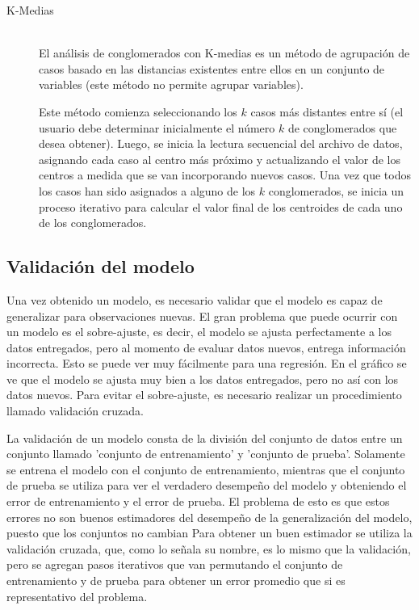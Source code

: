 \begin{enumerate}
\begin{description}
      \item[K-Medias] \hfill \\
      El análisis de conglomerados con K-medias es un método de agrupación de casos basado en las distancias existentes entre ellos en un conjunto de variables (este método no permite agrupar variables).
      
      Este método comienza seleccionando los $k$ casos más distantes entre sí (el usuario debe determinar inicialmente el número $k$ de conglomerados que desea obtener). Luego, se inicia la lectura secuencial del archivo de datos, asignando cada caso al centro más próximo y actualizando el valor de los centros a medida que se van incorporando nuevos casos. Una vez que todos los casos han sido asignados a alguno de los $k$ conglomerados, se inicia un proceso iterativo para calcular el valor final de los centroides de cada uno de los conglomerados. 
      
    \end{description}
\end{enumerate}


\subsection{Validación del modelo}

Una vez obtenido un modelo, es necesario validar que el modelo es capaz de generalizar para observaciones nuevas. El gran problema que puede ocurrir con un modelo es el sobre-ajuste\cite{Ng97preventingof}, es decir, el modelo se ajusta perfectamente a los datos entregados, pero al momento de evaluar datos nuevos, entrega información incorrecta. Esto se puede ver muy fácilmente para una regresión. En el gráfico se ve que el modelo se ajusta muy bien a los datos entregados, pero no así con los datos nuevos. Para evitar el sobre-ajuste, es necesario realizar un procedimiento llamado validación cruzada.

La validación de un modelo consta de la división del conjunto de datos entre un conjunto llamado 'conjunto de entrenamiento' y 'conjunto de prueba'. Solamente se entrena el modelo con el conjunto de entrenamiento, mientras que el conjunto de prueba se utiliza para ver el verdadero desempeño del modelo y obteniendo el error de entrenamiento y el error de prueba. El problema de esto es que estos errores no son buenos estimadores del desempeño de la generalización del modelo, puesto que los conjuntos no cambian Para obtener un buen estimador se utiliza la validación cruzada, que, como lo señala su nombre, es lo mismo que la validación, pero se agregan pasos iterativos que van permutando el conjunto de entrenamiento y de prueba para obtener un error promedio que si es representativo del problema.

